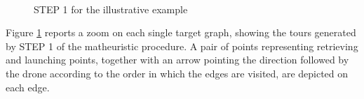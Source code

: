 \begin{figure}[h!]
    \centering
    \qquad
     \qquad
     \\
    \qquad
    \caption{STEP 1 for the illustrative example}%
    \label{fig:example2}%
\end{figure}

\noindent
Figure \ref{fig:example2} reports a zoom on each single target graph, showing the tours generated by STEP 1 of the matheuristic procedure. A pair of points representing retrieving and launching points,  together with an arrow pointing the direction followed by the drone according to the order in which the edges are visited, are depicted on each edge.

